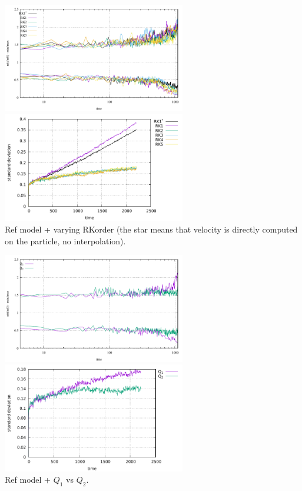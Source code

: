 \begin{center}
\includegraphics[width=8cm]{python_codes/fieldstone_30/results_solcx/markercount_rk12345}
\includegraphics[width=8cm]{python_codes/fieldstone_30/results_solcx/stdev_rk12345}\\
{\captionfont Ref model + varying RKorder (the star means that velocity 
is directly computed on the particle, no interpolation).}
\end{center} 

\begin{center}
\includegraphics[width=8cm]{python_codes/fieldstone_30/results_solcx/markercount_q12}
\includegraphics[width=8cm]{python_codes/fieldstone_30/results_solcx/stdev_q12}\\
{\captionfont Ref model + $Q_1$ vs $Q_2$. }
\end{center}

